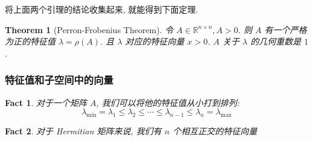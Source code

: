 \documentclass{article}
\newtheorem{fact}{Fact}
\newtheorem{theorem}{Theorem}
\begin{document}
将上面两个引理的结论收集起来, 就能得到下面定理.
\begin{theorem}[Perron-Frobenius Theorem]
  令 $A\in\mathbb{R}^{n\times n}, A > 0$.
  则 $A$ 有一个严格为正的特征值 $\lambda = \rho(A)$.
  且 $\lambda$ 对应的特征向量 $x > 0$.
  $A$ 关于 $\lambda$ 的几何重数是 $1$.
\end{theorem}

\subsubsection{特征值和子空间中的向量}
\begin{fact}
  对于一个矩阵 $A$, 我们可以将他的特征值从小打到排列:
  \[\lambda_{\min} = \lambda_1 \leq \lambda_2 \leq \cdots \leq \lambda_{n-1} \leq \lambda_n = \lambda_{\max}\]
\end{fact}

\begin{fact}
  对于 Hermitian 矩阵来说,  我们有 $n$ 个相互正交的特征向量
\end{fact}
\end{document}

